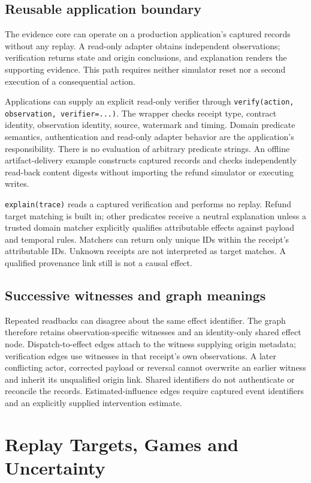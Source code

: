 \documentclass[conference]{IEEEtran}
\begin{document}
\subsection{Reusable application boundary}
The evidence core can operate on a production application's captured records
without any replay. A read-only adapter obtains independent observations;
verification returns state and origin conclusions, and explanation renders the
supporting evidence. This path requires neither simulator reset nor a second
execution of a consequential action.

Applications can supply an explicit read-only verifier through
\texttt{verify(action, observation, verifier=...)}. The wrapper checks receipt
type, contract identity, observation identity, source, watermark and timing.
Domain predicate semantics, authentication and read-only adapter behavior are
the application's responsibility. There is no evaluation of arbitrary predicate
strings. An offline artifact-delivery example constructs captured records and
checks independently read-back content digests without importing the refund
simulator or executing writes.

\texttt{explain(trace)} reads a captured verification and performs no replay.
Refund target matching is built in; other predicates receive a neutral
explanation unless a trusted domain matcher explicitly qualifies attributable
effects against payload and temporal rules. Matchers can return only unique
IDs within the receipt's attributable IDs. Unknown receipts are not interpreted
as target matches. A qualified provenance link still is not a causal effect.

\subsection{Successive witnesses and graph meanings}
Repeated readbacks can disagree about the same effect identifier. The graph
therefore retains observation-specific witnesses and an identity-only shared
effect node. Dispatch-to-effect edges attach to the witness supplying origin
metadata; verification edges use witnesses in that receipt's own observations.
A later conflicting actor, corrected payload or reversal cannot overwrite an
earlier witness and inherit its unqualified origin link. Shared identifiers do
not authenticate or reconcile the records. Estimated-influence edges require
captured event identifiers and an explicitly supplied intervention estimate.

\section{Replay Targets, Games and Uncertainty}
\end{document}
